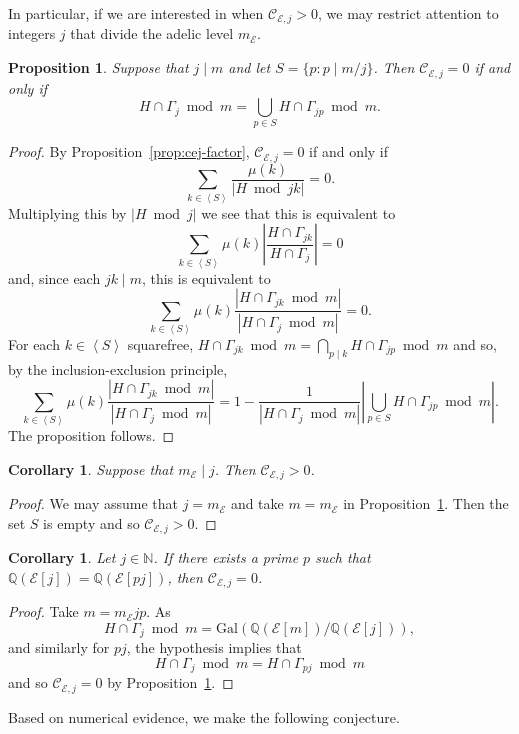 \documentclass{amsart}
\theoremstyle{plain}
\newtheorem{prop}[theorem]{Proposition}
\newtheorem{cor}[theorem]{Corollary}
\theoremstyle{remark}
\newcommand{\N}{\mathbb{N}}
\newcommand{\Q}{\mathbb{Q}}
\newcommand{\E}{\mathcal{E}}
\newcommand{\Cc}{\mathcal{C}}
\newcommand{\Gal}{\mathrm{Gal}}
\newcommand{\pres}[1]{\left\langle#1\right\rangle}
\begin{document}
In particular, if we are interested in when $\Cc_{\E,j} > 0$, we may restrict attention to integers $j$ that divide the adelic level $m_\E$.

\begin{prop}\label{prop:Cejiff} Suppose that $j \mid m$ and let $S = \{p : p \mid m/j\}$. Then $\Cc_{\E, j} = 0$ if and only if 
\[H \cap \Gamma_j \bmod m = \bigcup_{p \in S}H \cap \Gamma_{jp} \bmod m.\]
\end{prop}
\begin{proof}
    By Proposition~\ref{prop:cej-factor}, $\Cc_{\E, j} = 0$ if and only if 
    \[\sum_{k \in \pres{S}} \frac{\mu(k)}{|H\bmod jk|} = 0.\]
    Multiplying this by $|H\bmod j|$ we see that this is equivalent to 
    \[\sum_{k \in \pres{S}} \mu(k)\left|\frac{H\cap \Gamma_{jk}}{H\cap \Gamma_j}\right| = 0\]
    and, since each $jk \mid m$, this is equivalent to 
    \[\sum_{k \in \pres{S}} \mu(k)\frac{|H\cap \Gamma_{jk} \bmod m|}{|H\cap \Gamma_j \bmod m|} = 0.\]
    For each $k \in \pres{S}$ squarefree, $H\cap \Gamma_{jk} \bmod m = \bigcap_{p \mid k} H \cap \Gamma_{jp} \bmod m$ and so, by the inclusion-exclusion principle, 
        \[\sum_{k \in \pres{S}} \mu(k)\frac{|H\cap \Gamma_{jk}\bmod m|}{|H\cap \Gamma_j \bmod m|} = 1 - \frac{1}{|H\cap \Gamma_j \bmod m|}\left| \bigcup_{p \in S} H \cap \Gamma_{jp}\bmod m\right|.\]
    The proposition follows.
\end{proof}

\begin{cor}\label{cor:meqj}
    Suppose that $m_\E \mid j$. Then $\Cc_{\E, j} > 0$.
\end{cor}
\begin{proof}
   We may assume that $j = m_\E$ and take $m = m_\E$ in Proposition~\ref{prop:Cejiff}. Then the set $S$ is empty and so
   $\Cc_{\E, j} > 0$.
\end{proof}

\begin{cor} \label{cor:revdir}
    Let $j \in \N$. If there exists a prime $p$ such that $\Q(\E[j])=\Q(\E[pj])$, then $\Cc_{\E,j}=0$.
\end{cor}
\begin{proof}
Take $m = m_\E jp$. As 
\[H \cap \Gamma_j \bmod m = \Gal(\Q(\E[m])/\Q(\E[j])),\] and similarly for $pj$, the hypothesis implies that \[H \cap \Gamma_{j} \bmod m = H \cap \Gamma_{pj} \bmod m\]
and so $\Cc_{\E,j} = 0$ by Proposition~\ref{prop:Cejiff}.
\end{proof}

Based on numerical evidence, we make the following conjecture.
\end{document}
